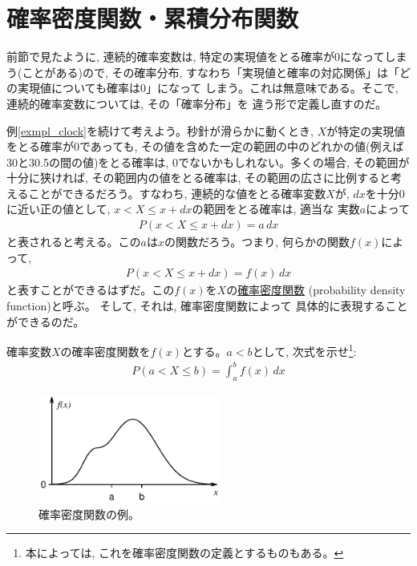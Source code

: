 \section{確率密度関数・累積分布関数}

前節で見たように, 連続的確率変数は, 特定の実現値をとる確率が0になってしまう(ことがある)ので, 
その確率分布, すなわち「実現値と確率の対応関係」は「どの実現値についても確率は0」になって
しまう。これは無意味である。そこで, 連続的確率変数については, その「確率分布」を
違う形で定義し直すのだ。

例\ref{exmpl_clock}を続けて考えよう。秒針が滑らかに動くとき, $X$が特定の実現値をとる確率が0であっても, 
その値を含めた一定の範囲の中のどれかの値(例えば30と30.5の間の値)をとる確率は, 
0でないかもしれない。多くの場合, その範囲が十分に狭ければ, その範囲内の値をとる確率は, 
その範囲の広さに比例すると考えることができるだろう。すなわち, 連続的な値をとる確率変数$X$が, 
$dx$を十分0に近い正の値として, $x < X \le x+dx$の範囲をとる確率は, 適当な
実数$a$によって
\begin{eqnarray}
P(x < X \le x+dx)=a\,dx
\end{eqnarray}
と表されると考える。この$a$は$x$の関数だろう。つまり, 何らかの関数$f(x)$によって, 
\begin{eqnarray}P(x < X \le x+dx)=f(x)\,dx\label{eq:defProbDensFunc}\end{eqnarray}
と表すことができるはずだ。この$f(x)$を$X$の\underline{確率密度関数}
 (probability density function)と呼ぶ。
そして, それは, 確率密度関数によって
具体的に表現することができるのだ。
\mv

\begin{q}\label{q:stat_densityF} 確率変数$X$の確率密度関数を$f(x)$とする。$a<b$として, 
次式を示せ\footnote{本によっては, これを確率密度関数の定義とするものもある。}:
\begin{eqnarray}
P(a < X \le b)=\int_{a}^{b}f(x)\,dx\label{eq:probdistX1X2}
\end{eqnarray}
\end{q}\mv

\begin{figure}[h]
    \centering
    \includegraphics[width=6cm]{probdensity.eps}
    \caption{確率密度関数の例。}\label{fig:probdensity}
\end{figure}

